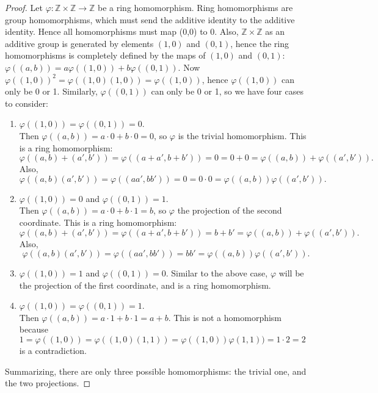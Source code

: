\documentclass{article}
\begin{document}
\begin{enumerate}[label={\bf Q\arabic*:}]
    \begin{proof}
      Let $\varphi:\mathbb{Z}\times\mathbb{Z}\rightarrow\mathbb{Z}$ be a
      ring homomorphism. Ring homomorphisms are group homomorphisms, which
      must send the additive identity to the additive identity. Hence all
      homomorphisms must map (0,0) to 0. Also, $\mathbb{Z}\times\mathbb{Z}$
      as an additive group is generated by elements $(1,0)$ and $(0,1)$,
      hence the ring homomorphisms is completely defined by the maps of
      $(1,0)$ and $(0,1)$: $\varphi((a,b))=a\varphi((1,0))+b\varphi((0,1))$.
      Now $\varphi((1,0))^2=\varphi((1,0)(1,0))=\varphi((1,0))$, hence
      $\varphi((1,0))$ can only be 0 or 1. Similarly, $\varphi((0,1))$ can
      only be 0 or 1, so we have four cases to consider:
      \begin{enumerate}
        \item $\varphi((1,0))=\varphi((0,1))=0$. \\
          Then $\varphi((a,b))=a\cdot0+b\cdot0=0$, so $\varphi$ is the
          trivial homomorphism. This is a ring homomorphism:
          \[\varphi((a,b)+(a',b'))=\varphi((a+a',b+b'))=0=0+0=
          \varphi((a,b))+\varphi((a',b')).\] Also,
          \[\varphi((a,b)(a',b'))=\varphi((aa',bb'))=0=0\cdot0=
          \varphi((a,b))\varphi((a',b')).\]
        \item $\varphi((1,0))=0$ and $\varphi((0,1))=1$. \\
          Then $\varphi((a,b))=a\cdot0+b\cdot1=b$, so $\varphi$ the
          projection of the second coordinate. This is a ring homomorphism:
          \[\varphi((a,b)+(a',b'))=\varphi((a+a',b+b'))=b+b'=
          \varphi((a,b))+\varphi((a',b')).\] Also,
          \[\varphi((a,b)(a',b'))=\varphi((aa',bb'))=bb'=
          \varphi((a,b))\varphi((a',b')).\]
        \item $\varphi((1,0))=1$ and $\varphi((0,1))=0$. Similar to the
          above case, $\varphi$ will be the projection of the first
          coordinate, and is a ring homomorphism.
        \item $\varphi((1,0))=\varphi((0,1))=1$. \\
          Then $\varphi((a,b))=a\cdot1+b\cdot1=a+b$. This is not a
          homomorphism because
          $1=\varphi((1,0))=\varphi((1,0)(1,1))=\varphi((1,0))\varphi(1,1))=1\cdot2=2$
          is a contradiction.
      \end{enumerate}
      Summarizing, there are only three possible homomorphisms: the trivial
      one, and the two projections. 
    \end{proof}


\end{enumerate}
\end{document}
